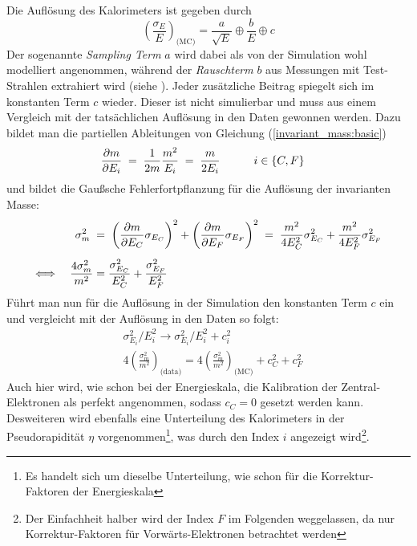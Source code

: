 Die Auflösung des Kalorimeters ist gegeben durch
\begin{equation}
    \left(\frac{\sigma_E}{E}\right)_\text{(MC)} =
        \frac{a}{\sqrt{E}} \oplus \frac{b}{E} \oplus c
\end{equation}
Der sogenannte \textit{Sampling Term} $a$ wird dabei als von der Simulation
wohl modelliert angenommen, während der \textit{Rauschterm} $b$ aus Messungen
mit Test-Strahlen extrahiert wird (siehe \cite{1748-0221-5-11-P11006}). Jeder
zusätzliche Beitrag spiegelt sich im konstanten Term $c$ wieder. Dieser ist
nicht simulierbar und muss aus einem Vergleich mit der tatsächlichen Auflösung
in den Daten gewonnen werden. Dazu bildet man die partiellen Ableitungen von
Gleichung (\ref{invariant_mass:basic})
\begin{align}
    \frac{\partial m}{\partial E_i} \;&=\; \frac{1}{2m} \frac{m^2}{E_i}
        \;=\; \frac{m}{2 E_i} \qquad\quad i \in \{C,F\}
\end{align}
und bildet die Gaußsche Fehlerfortpflanzung für die Auflösung der invarianten
Masse:
\begin{align}
    \sigma_m^2 \;&=\; \left(\frac{\partial m}{\partial E_C}\sigma_{E_C}\right)^2 +
                      \left(\frac{\partial m}{\partial E_F}\sigma_{E_F}\right)^2
                \;=\; \frac{m^2}{4E_C^2}\sigma_{E_C}^2 +
                      \frac{m^2}{4E_F^2}\sigma_{E_F}^2
                      \nonumber \\[5pt]
    \Longleftrightarrow \quad
    \frac{4\sigma_m^2}{m^2} &= \frac{\sigma_{E_C}^2}{E_C^2} +
                               \frac{\sigma_{E_F}^2}{E_F^2}
\end{align}
Führt man nun für die Auflösung in der Simulation den konstanten Term $c$ ein
und vergleicht mit der Auflösung in den Daten so folgt:
\begin{align}
    &\sigma_{E_i}^2/E_i^2 \longrightarrow \sigma_{E_i}^2/E_i^2 + c_i^2
    \nonumber \\[10pt]
    &4\left(\frac{\sigma_m^2}{m^2}\right)_\text{(data)}
        = 4\left(\frac{\sigma_m^2}{m^2}\right)_\text{(MC)}
        + c_C^2 + c_F^2
\end{align}
Auch hier wird, wie schon bei der Energieskala, die Kalibration der
Zentral-Elektronen als perfekt angenommen, sodass $c_C = 0$ gesetzt werden
kann. Desweiteren wird ebenfalls eine Unterteilung des Kalorimeters in der
Pseudorapidität $\eta$ vorgenommen\footnote{Es handelt sich um dieselbe
Unterteilung, wie schon für die Korrektur-Faktoren der Energieskala},
was durch den Index $i$ angezeigt wird\footnote{Der Einfachheit halber wird der
Index $F$ im Folgenden weggelassen, da nur Korrektur-Faktoren für
Vorwärts-Elektronen betrachtet werden}.

